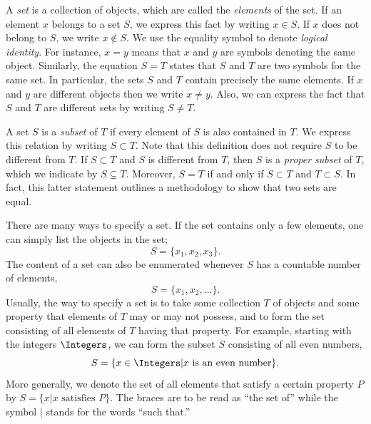 A \emph{set} is a collection of objects, which are called the \emph{elements} of the set.
If an element $x$ belongs to a set $S$, we express this fact by writing $x \in S$.
If $x$ does not belong to $S$, we write $x \notin S$.
We use the equality symbol to denote \emph{logical identity}.
For instance, $x = y$ means that $x$ and $y$ are symbols denoting the same object.
Similarly, the equation $S = T$ states that $S$ and $T$ are two symbols for the same set.
In particular, the sets $S$ and $T$ contain precisely the same elements.
If $x$ and $y$ are different objects then we write $x \neq y$.
Also, we can express the fact that $S$ and $T$ are different sets by writing $S \neq T$.

A set $S$ is a \emph{subset} of $T$ if every element of $S$ is also contained in $T$.
We express this relation by writing $S \subset T$.
Note that this definition does not require $S$ to be different from $T$.
If $S \subset T$ and $S$ is different from $T$, then $S$ is a \emph{proper subset} of $T$, which we indicate by $S \subsetneq T$.
Moreover, $S = T$ if and only if $S \subset T$ and $T \subset S$.
In fact, this latter statement outlines a methodology to show that two sets are equal.

There are many ways to specify a set.
If the set contains only a few elements, one can simply list the objects in the set;
\begin{equation*}
S = \{ x_1, x_2, x_3 \} .
\end{equation*}
The content of a set can also be enumerated whenever $S$ has a countable number of elements,
\begin{equation*}
S = \{ x_1, x_2, \ldots \} .
\end{equation*}
Usually, the way to specify a set is to take some collection $T$ of objects and some property that elements of $T$ may or may not possess, and to form the set consisting of all elements of $T$ having that property.
For example, starting with the integers $\Integers$, we can form the subset $S$ consisting of all even numbers,
\begin{equation*}
S = \{ x \in \Integers | x \text{ is an even number} \}.
\end{equation*}
More generally, we denote the set of all elements that satisfy a certain property $P$ by $S = \{ x | x \text{ satisfies } P \}$.
The braces are to be read as ``the set of'' while the symbol $|$ stands for the words ``such that.''

